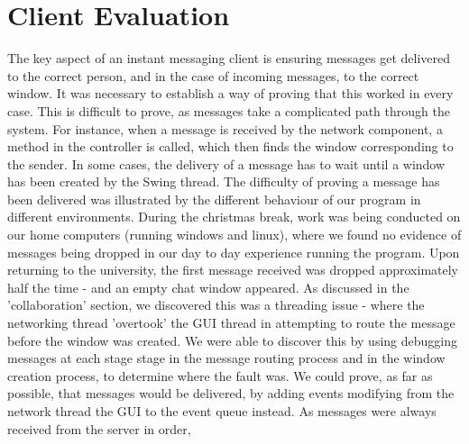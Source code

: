 \section{Client Evaluation}
\label{client_eval}

The key aspect of an instant messaging client is ensuring messages get delivered to the correct person, and in the case of incoming messages, to the correct window. It was necessary to establish a way of proving that this worked in every case. This is difficult to prove, as messages take a complicated path through the system. For instance, when a message is received by the network component, a method in the controller is called, which then finds the window corresponding to the sender. In some cases, the delivery of a message has to wait until a window has been created by the Swing thread. The difficulty of proving a message has been delivered was illustrated by the different behaviour of our program in different environments. During the christmas break, work was being conducted on our home computers (running windows and linux), where we found no evidence of messages being dropped in our day to day experience running the program. Upon returning to the university, the first message received was dropped approximately half the time - and an empty chat window appeared. As discussed in the 'collaboration' section, we discovered this was a threading issue - where the networking thread 'overtook' the GUI thread in attempting to route the message before the window was created. We were able to discover this by using debugging messages at each stage stage in the message routing process and in the window creation process, to determine where the fault was. We could prove, as far as possible, that messages would be delivered, by adding events modifying from the network thread the GUI to the event queue instead. As messages were always received from the server in order,  





